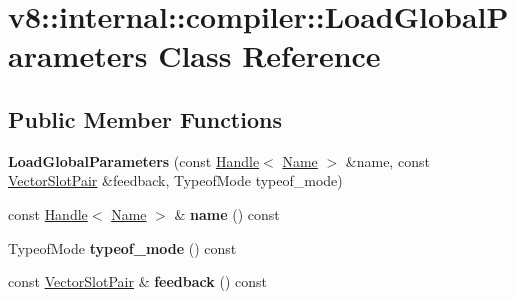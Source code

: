 \hypertarget{classv8_1_1internal_1_1compiler_1_1_load_global_parameters}{}\section{v8\+:\+:internal\+:\+:compiler\+:\+:Load\+Global\+Parameters Class Reference}
\label{classv8_1_1internal_1_1compiler_1_1_load_global_parameters}
\subsection*{Public Member Functions}
\begin{DoxyCompactItemize}
\item 
{\bfseries Load\+Global\+Parameters} (const \hyperlink{classv8_1_1internal_1_1_handle}{Handle}$<$ \hyperlink{classv8_1_1internal_1_1_name}{Name} $>$ \&name, const \hyperlink{classv8_1_1internal_1_1compiler_1_1_vector_slot_pair}{Vector\+Slot\+Pair} \&feedback, Typeof\+Mode typeof\+\_\+mode)\hypertarget{classv8_1_1internal_1_1compiler_1_1_load_global_parameters_aac66f943479ee2e5aa460e94b8cca7a5}{}\label{classv8_1_1internal_1_1compiler_1_1_load_global_parameters_aac66f943479ee2e5aa460e94b8cca7a5}

\item 
const \hyperlink{classv8_1_1internal_1_1_handle}{Handle}$<$ \hyperlink{classv8_1_1internal_1_1_name}{Name} $>$ \& {\bfseries name} () const \hypertarget{classv8_1_1internal_1_1compiler_1_1_load_global_parameters_ac3eb16b06ffc257c3812beed4ad10322}{}\label{classv8_1_1internal_1_1compiler_1_1_load_global_parameters_ac3eb16b06ffc257c3812beed4ad10322}

\item 
Typeof\+Mode {\bfseries typeof\+\_\+mode} () const \hypertarget{classv8_1_1internal_1_1compiler_1_1_load_global_parameters_a4ded13860e911179cd9b20881e47eb64}{}\label{classv8_1_1internal_1_1compiler_1_1_load_global_parameters_a4ded13860e911179cd9b20881e47eb64}

\item 
const \hyperlink{classv8_1_1internal_1_1compiler_1_1_vector_slot_pair}{Vector\+Slot\+Pair} \& {\bfseries feedback} () const \hypertarget{classv8_1_1internal_1_1compiler_1_1_load_global_parameters_adf07f030e260c601914860692d8caa1e}{}\label{classv8_1_1internal_1_1compiler_1_1_load_global_parameters_adf07f030e260c601914860692d8caa1e}

\end{DoxyCompactItemize}
